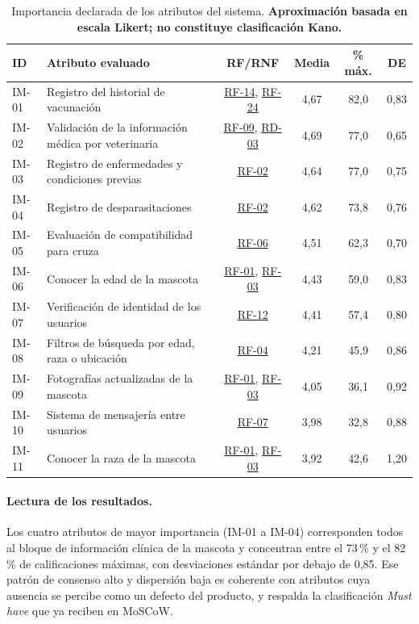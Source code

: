 \documentclass[journal,onecolumn]{IEEEtran}
\begin{document}
	\begin{table}[H]
		\centering
		\caption[Importancia declarada de los atributos (aproximación, no Kano)]{Importancia declarada de los atributos del sistema. \textbf{Aproximación basada en escala Likert; no constituye clasificación Kano.}}
		\label{tab:importancia-declarada}
		\small
		\begin{tabularx}{\textwidth}{@{}l X c c c c@{}}
			\toprule
			\textbf{ID} & \textbf{Atributo evaluado} & \textbf{RF/RNF} & \textbf{Media} & \textbf{\% máx.} & \textbf{DE} \\
			\midrule
			IM-01 & Registro del historial de vacunación & \hyperref[tab:RF-14]{RF-14}, \hyperref[tab:RF-24]{RF-24} & 4,67 & 82,0 & 0,83 \\
			IM-02 & Validación de la información médica por veterinaria & \hyperref[tab:RF-09]{RF-09}, \hyperref[tab:RD-03]{RD-03} & 4,69 & 77,0 & 0,65 \\
			IM-03 & Registro de enfermedades y condiciones previas & \hyperref[tab:RF-02]{RF-02} & 4,64 & 77,0 & 0,75 \\
			IM-04 & Registro de desparasitaciones & \hyperref[tab:RF-02]{RF-02} & 4,62 & 73,8 & 0,76 \\
			IM-05 & Evaluación de compatibilidad para cruza & \hyperref[tab:RF-06]{RF-06} & 4,51 & 62,3 & 0,70 \\
			IM-06 & Conocer la edad de la mascota & \hyperref[tab:RF-01]{RF-01}, \hyperref[tab:RF-03]{RF-03} & 4,43 & 59,0 & 0,83 \\
			IM-07 & Verificación de identidad de los usuarios & \hyperref[tab:RF-12]{RF-12} & 4,41 & 57,4 & 0,80 \\
			IM-08 & Filtros de búsqueda por edad, raza o ubicación & \hyperref[tab:RF-04]{RF-04} & 4,21 & 45,9 & 0,86 \\
			IM-09 & Fotografías actualizadas de la mascota & \hyperref[tab:RF-01]{RF-01}, \hyperref[tab:RF-03]{RF-03} & 4,05 & 36,1 & 0,92 \\
			IM-10 & Sistema de mensajería entre usuarios & \hyperref[tab:RF-07]{RF-07} & 3,98 & 32,8 & 0,88 \\
			IM-11 & Conocer la raza de la mascota & \hyperref[tab:RF-01]{RF-01}, \hyperref[tab:RF-03]{RF-03} & 3,92 & 42,6 & 1,20 \\
			\bottomrule
		\end{tabularx}
	\end{table}
	
	\paragraph{Lectura de los resultados.}
	Los cuatro atributos de mayor importancia (IM-01 a IM-04) corresponden todos
	al bloque de información clínica de la mascota y concentran entre el 73\,\%
	y el 82\,\% de calificaciones máximas, con desviaciones estándar por debajo
	de 0,85. Ese patrón de consenso alto y dispersión baja es coherente con
	atributos cuya ausencia se percibe como un defecto del producto, y respalda
	la clasificación \emph{Must have} que ya reciben en MoSCoW.
	
\end{document}

